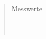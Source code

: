 \begin{quote}
\begin{table}[h]
\begin{addmargin}[-1cm]{3cm}
\begin{tabular}{|p{3cm}|p{3cm}|p{10.2cm}|}
                                 &           &                  \\ 
                                 &           &                  \\
                                 &           &                  \\ 
                                 &           &                  \\
                                 &           &                  \\ 
                                 &           &                  \\
   
         \hline

                     \end{tabular}
                 \end{addmargin}
             \caption{Messwerte}
           \label{Messwerte1}
        \end{table}
      
       \vspace{2em}
       

\end{quote}
